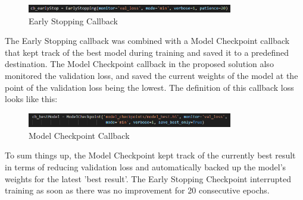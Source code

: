 \begin{figure}[H]
  \begin{center}
  \includegraphics[angle=0, width=0.8\textwidth]{Figures/EarlyStopping.PNG}
  \caption{Early Stopping Callback}
  \label{fig:EarlyStopping}
  \end{center}
\end{figure}

The Early Stopping callback was combined with a Model Checkpoint callback that kept track of the best model during training and saved it to a predefined destination. The Model Checkpoint callback in the proposed solution also monitored the validation loss, and saved the current weights of the model at the point of the validation loss being the lowest. The definition of this callback loss looks like this:

\begin{figure}[H]
  \begin{center}
  \includegraphics[angle=0, width=0.8\textwidth]{Figures/ModelCheckpoint.PNG}
  \caption{Model Checkpoint Callback}
  \label{fig:ModelCheckpoint}
  \end{center}
\end{figure}

To sum things up, the Model Checkpoint kept track of the currently best result in terms of reducing validation loss and automatically backed up the model's weights for the latest 'best result'. The Early Stopping Checkpoint interrupted training as soon as there was no improvement for 20 consecutive epochs.

